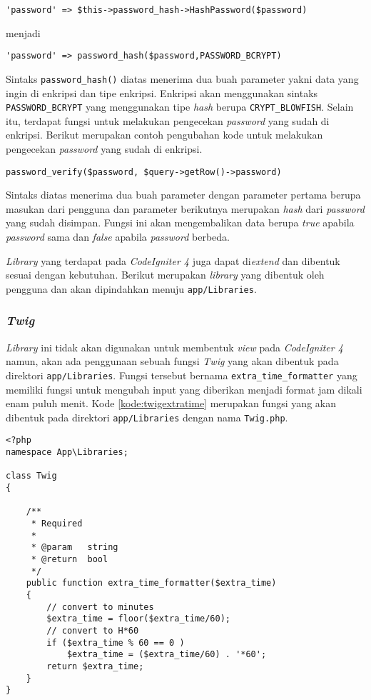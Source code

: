 \begin{center}
\verb|'password' => $this->password_hash->HashPassword($password)|
\end{center}
menjadi
\begin{center}
\verb|'password' => password_hash($password,PASSWORD_BCRYPT)|
\end{center}

Sintaks \texttt{password\_hash()} diatas menerima dua buah parameter yakni data yang ingin di enkripsi dan tipe enkripsi. Enkripsi akan menggunakan sintaks \texttt{PASSWORD\_BCRYPT} yang menggunakan tipe \textit{hash} berupa \texttt{CRYPT\_BLOWFISH}. Selain itu, terdapat fungsi untuk melakukan pengecekan \textit{password} yang sudah di enkripsi. Berikut merupakan contoh pengubahan kode untuk melakukan pengecekan \textit{password} yang sudah di enkripsi.
\begin{center}
\verb|password_verify($password, $query->getRow()->password)|
\end{center}
Sintaks diatas menerima dua buah parameter dengan parameter pertama berupa masukan dari pengguna dan parameter berikutnya merupakan \textit{hash} dari \textit{password} yang sudah disimpan. Fungsi ini akan mengembalikan data berupa \textit{true} apabila \textit{password} sama dan \textit{false} apabila \textit{password} berbeda.

\textit{Library} yang terdapat pada \textit{CodeIgniter 4} juga dapat di\textit{extend} dan dibentuk sesuai dengan kebutuhan. Berikut merupakan \textit{library} yang dibentuk oleh pengguna dan akan dipindahkan menuju \texttt{app/Libraries}.

\subsubsection{\textit{Twig}}
\textit{Library} ini tidak akan digunakan untuk membentuk \textit{view} pada \textit{CodeIgniter 4} namun, akan ada penggunaan sebuah fungsi \textit{Twig} yang akan dibentuk pada direktori \texttt{app/Libraries}. Fungsi tersebut bernama \texttt{extra\_time\_formatter} yang memiliki fungsi untuk mengubah input yang diberikan menjadi format jam dikali enam puluh menit. Kode \ref{kode:twigextratime} merupakan fungsi yang akan dibentuk pada direktori \texttt{app/Libraries} dengan nama \texttt{Twig.php}.
\begin{lstlisting}[caption=Perancangan perubahan \textit{library MY\_Form\_validation} pada \textit{CodeIgniter 4}, label=kode:twigextratime]
<?php
namespace App\Libraries;

class Twig
{

	/**
	 * Required
	 *
	 * @param	string
	 * @return	bool
	 */
	public function extra_time_formatter($extra_time)
	{
		// convert to minutes
		$extra_time = floor($extra_time/60);
		// convert to H*60
		if ($extra_time % 60 == 0 )
			$extra_time = ($extra_time/60) . '*60';
		return $extra_time;
	}
}

\end{lstlisting}

